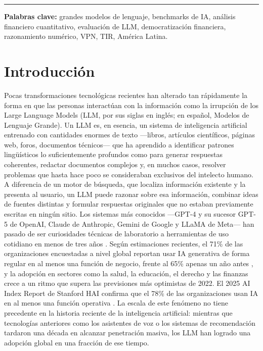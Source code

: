 \documentclass[12pt,a4paper]{article}
\begin{document}
\begin{titlepage}
\begin{abstract}
  \end{abstract}
  \noindent\rule{\textwidth}{0.4pt}
  \vspace{1cm}
  \noindent\textbf{Palabras clave:} grandes modelos de lenguaje, benchmarks de IA, análisis financiero cuantitativo, evaluación de LLM, democratización financiera, razonamiento numérico, VPN, TIR, América Latina.
\end{titlepage}

\tableofcontents
\newpage

\section{Introducción}

Pocas transformaciones tecnológicas recientes han alterado tan rápidamente la forma en que las personas interactúan con la información como la irrupción de los Large Language Models (LLM, por sus siglas en inglés; en español, Modelos de Lenguaje Grande). Un LLM es, en esencia, un sistema de inteligencia artificial entrenado con cantidades enormes de texto ---libros, artículos científicos, páginas web, foros, documentos técnicos--- que ha aprendido a identificar patrones lingüísticos lo suficientemente profundos como para generar respuestas coherentes, redactar documentos complejos y, en muchos casos, resolver problemas que hasta hace poco se consideraban exclusivos del intelecto humano. A diferencia de un motor de búsqueda, que localiza información existente y la presenta al usuario, un LLM puede razonar sobre esa información, combinar ideas de fuentes distintas y formular respuestas originales que no estaban previamente escritas en ningún sitio. Los sistemas más conocidos ---GPT-4 y su sucesor GPT-5 de OpenAI, Claude de Anthropic, Gemini de Google y LLaMA de Meta--- han pasado de ser curiosidades técnicas de laboratorio a herramientas de uso cotidiano en menos de tres años \citep{Brown2020, Touvron2023}. Según estimaciones recientes, el 71\% de las organizaciones encuestadas a nivel global reportan usar IA generativa de forma regular en al menos una función de negocio, frente al 65\% apenas un año antes \citep{McKinsey2025}, y la adopción en sectores como la salud, la educación, el derecho y las finanzas crece a un ritmo que supera las previsiones más optimistas de 2022. El 2025 AI Index Report de Stanford HAI confirma que el 78\% de las organizaciones usan IA en al menos una función operativa \citep{StanfordHAI2025}. La escala de este fenómeno no tiene precedente en la historia reciente de la inteligencia artificial: mientras que tecnologías anteriores como los asistentes de voz o los sistemas de recomendación tardaron una década en alcanzar penetración masiva, los LLM han logrado una adopción global en una fracción de ese tiempo.
\end{document}
